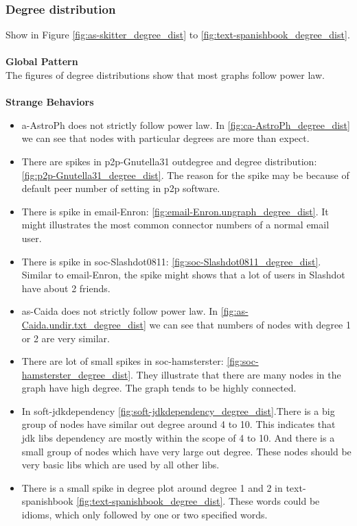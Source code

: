 
\subsubsection{Degree distribution}

Show in Figure \ref{fig:as-skitter_degree_dist} to  \ref{fig:text-spanishbook_degree_dist}. \\
\\
\textbf{Global Pattern} \\
The figures of degree distributions show that most graphs follow power law. \\
\\
\textbf{Strange Behaviors} \\
\begin{itemize} 
\item a-AstroPh does not strictly follow power law. In \ref{fig:ca-AstroPh_degree_dist} we can see that nodes with particular degrees are more than expect. \\
\item There are spikes in p2p-Gnutella31 outdegree and degree distribution: \ref{fig:p2p-Gnutella31_degree_dist}. The reason for the spike may be because of default peer number of setting in p2p software. \\
\item There is spike in email-Enron:  \ref{fig:email-Enron.ungraph_degree_dist}. It might illustrates the most common connector numbers of a normal email user.\\
\item There is spike in soc-Slashdot0811: \ref{fig:soc-Slashdot0811_degree_dist}. Similar to email-Enron, the spike might shows that a lot of users in Slashdot have about 2 friends.\\
\item as-Caida does not strictly follow power law. In \ref{fig:as-Caida.undir.txt_degree_dist} we can see that numbers of nodes with degree 1 or 2 are very similar. \\
\item There are lot of small spikes in soc-hamsterster: \ref{fig:soc-hamsterster_degree_dist}. They illustrate that there are many nodes in the graph have high degree. The graph tends to be highly connected.\\
\item In soft-jdkdependency \ref{fig:soft-jdkdependency_degree_dist}.There is a big group of nodes have similar out degree around 4 to 10. This indicates that jdk libs dependency are mostly within the scope of 4 to 10. And there is a small group of nodes which have very large out degree. These nodes should be very basic libs which are used by all other libs.\\
\item There is a small spike in degree plot around degree 1 and 2 in text-spanishbook \ref{fig:text-spanishbook_degree_dist}. These words could be idioms, which only followed by one or two specified words.
\end{itemize}

